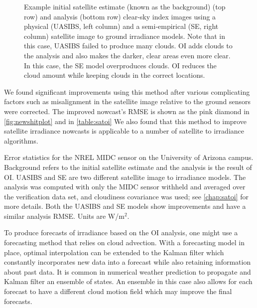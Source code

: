 \begin{figure}[htbp]
\caption[Improved satellite irradiance estimates using optimal
interpolation]{Example initial satellite estimate (known as the
  background) (top row) and analysis (bottom row) clear-sky index
  images using a physical (UASIBS, left column) and a semi-empirical
  (SE, right column) satellite image to ground irradiance models. Note
  that in this case, UASIBS failed to produce many clouds. OI adds
  clouds to the analysis and also makes the darker, clear areas even
  more clear.  In this case, the SE model overproduces clouds. OI
  reduces the cloud amount while keeping clouds in the correct
  locations.}
\label{fig:oi_example}
\end{figure}


We found significant improvements using this method after various
complicating factors such as misalignment in the satellite image
relative to the ground sensors were corrected.
The improved nowcast's RMSE is shown as the pink diamond in
\cref{fig:newshitplot} and in \cref{table:satoi}
We also found that this method to improve satellite irradiance
nowcasts is applicable to a number of satellite to irradiance
algorithms.

\begin{table}[bth]
  \caption[Optimal interpolation error metrics]{ Error statistics for
the NREL MIDC sensor on the University of Arizona campus. Background
refers to the initial satellite estimate and the analysis is the
result of OI. UASIBS and SE are two different satellite image to
irradiance models. The analysis was computed with only the MIDC sensor
withheld and averaged over the verification data set, and cloudiness
covariance was used; see \cref{chap:satoi} for more details. Both the
UASIBS and SE models show improvements and have a similar analysis
RMSE\@. Units are W/m$^2$.}
\label{table:satoi}
\vspace{0.5em}

\centering
\end{table}

To produce forecasts of irradiance based on the OI analysis, one might
use a forecasting method that relies on cloud advection.
With a forecasting model in place, optimal interpolation can be
extended to the Kalman filter which constantly incorporates new data
into a forecast while also retaining information about past data.
It is common in numerical weather prediction to propagate and Kalman
filter  an ensemble of states.
An ensemble in this case also allows for each forecast to have a
different cloud motion field which may improve the final forecasts.

